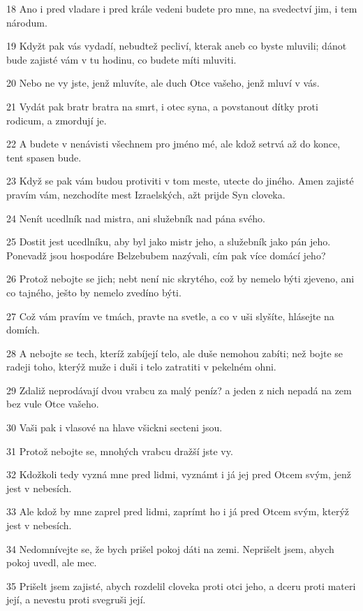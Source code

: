 \par 18 Ano i pred vladare i pred krále vedeni budete pro mne, na svedectví jim, i tem národum.
\par 19 Kdyžt pak vás vydadí, nebudtež pecliví, kterak aneb co byste mluvili; dánot bude zajisté vám v tu hodinu, co budete míti mluviti.
\par 20 Nebo ne vy jste, jenž mluvíte, ale duch Otce vašeho, jenž mluví v vás.
\par 21 Vydát pak bratr bratra na smrt, i otec syna, a povstanout dítky proti rodicum, a zmordují je.
\par 22 A budete v nenávisti všechnem pro jméno mé, ale kdož setrvá až do konce, tent spasen bude.
\par 23 Když se pak vám budou protiviti v tom meste, utecte do jiného. Amen zajisté pravím vám, nezchodíte mest Izraelských, ažt prijde Syn cloveka.
\par 24 Nenít ucedlník nad mistra, ani služebník nad pána svého.
\par 25 Dostit jest ucedlníku, aby byl jako mistr jeho, a služebník jako pán jeho. Ponevadž jsou hospodáre Belzebubem nazývali, cím pak více domácí jeho?
\par 26 Protož nebojte se jich; nebt není nic skrytého, což by nemelo býti zjeveno, ani co tajného, ješto by nemelo zvedíno býti.
\par 27 Což vám pravím ve tmách, pravte na svetle, a co v uši slyšíte, hlásejte na domích.
\par 28 A nebojte se tech, kteríž zabíjejí telo, ale duše nemohou zabíti; než bojte se radeji toho, kterýž muže i duši i telo zatratiti v pekelném ohni.
\par 29 Zdaliž neprodávají dvou vrabcu za malý peníz? a jeden z nich nepadá na zem bez vule Otce vašeho.
\par 30 Vaši pak i vlasové na hlave všickni secteni jsou.
\par 31 Protož nebojte se, mnohých vrabcu dražší jste vy.
\par 32 Kdožkoli tedy vyzná mne pred lidmi, vyznámt i já jej pred Otcem svým, jenž jest v nebesích.
\par 33 Ale kdož by mne zaprel pred lidmi, zaprímt ho i já pred Otcem svým, kterýž jest v nebesích.
\par 34 Nedomnívejte se, že bych prišel pokoj dáti na zemi. Neprišelt jsem, abych pokoj uvedl, ale mec.
\par 35 Prišelt jsem zajisté, abych rozdelil cloveka proti otci jeho, a dceru proti materi její, a nevestu proti svegruši její.
